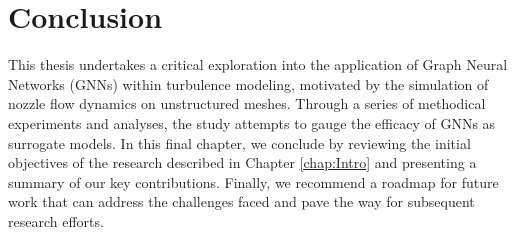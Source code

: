 \chapter{Conclusion}
\label{chap:Conclusion}
This thesis undertakes a critical exploration into the application of Graph Neural Networks (GNNs) within turbulence modeling, motivated by the simulation of nozzle flow dynamics on unstructured meshes. Through a series of methodical experiments and analyses, the study attempts to gauge the efficacy of GNNs as surrogate models. 
In this final chapter, we conclude by reviewing the initial objectives of the research described in Chapter \ref{chap:Intro} and presenting a summary of our key contributions. Finally, we recommend a roadmap for future work that can address the challenges faced and pave the way for subsequent research efforts. 









